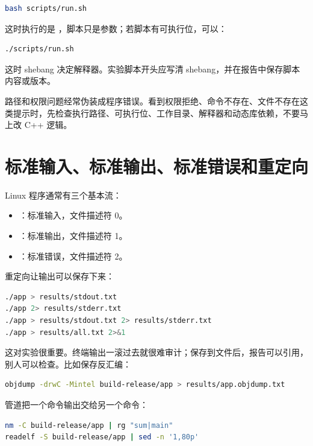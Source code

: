\begin{lstlisting}[language=bash]
bash scripts/run.sh
\end{lstlisting}

这时执行的是 ，脚本只是参数；若脚本有可执行位，可以：

\begin{lstlisting}[language=bash]
./scripts/run.sh
\end{lstlisting}

这时 shebang 决定解释器。实验脚本开头应写清 shebang，并在报告中保存脚本内容或版本。

\begin{warningbox}
路径和权限问题经常伪装成程序错误。看到权限拒绝、命令不存在、文件不存在这类提示时，先检查执行路径、可执行位、工作目录、解释器和动态库依赖，不要马上改 C++ 逻辑。
\end{warningbox}

\section{标准输入、标准输出、标准错误和重定向}

Linux 程序通常有三个基本流：

\begin{itemize}
  \item {}：标准输入，文件描述符 0。
  \item {}：标准输出，文件描述符 1。
  \item {}：标准错误，文件描述符 2。
\end{itemize}

重定向让输出可以保存下来：

\begin{lstlisting}[language=bash]
./app > results/stdout.txt
./app 2> results/stderr.txt
./app > results/stdout.txt 2> results/stderr.txt
./app > results/all.txt 2>&1
\end{lstlisting}

这对实验很重要。终端输出一滚过去就很难审计；保存到文件后，报告可以引用，别人可以检查。比如保存反汇编：

\begin{lstlisting}[language=bash]
objdump -drwC -Mintel build-release/app > results/app.objdump.txt
\end{lstlisting}

管道把一个命令输出交给另一个命令：

\begin{lstlisting}[language=bash]
nm -C build-release/app | rg "sum|main"
readelf -S build-release/app | sed -n '1,80p'
\end{lstlisting}

